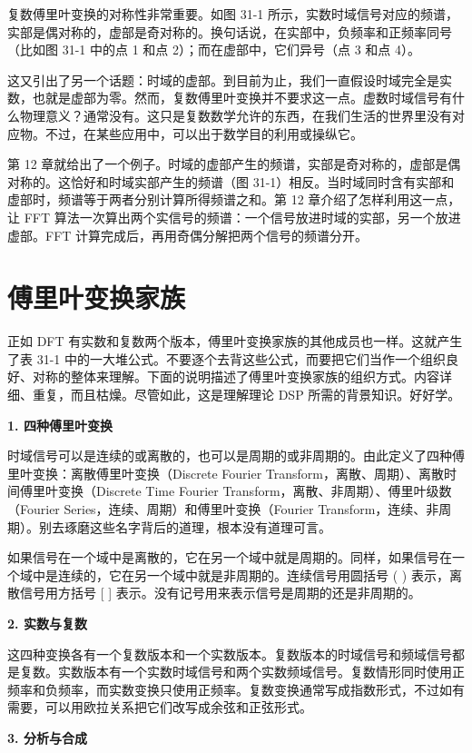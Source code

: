 复数傅里叶变换的对称性非常重要。如图 31-1
所示，实数时域信号对应的频谱，实部是偶对称的，虚部是奇对称的。换句话说，在实部中，负频率和正频率同号（比如图
31-1 中的点 1 和点 2）；而在虚部中，它们异号（点 3 和点 4）。

这又引出了另一个话题：时域的虚部。到目前为止，我们一直假设时域完全是实数，也就是虚部为零。然而，复数傅里叶变换并不要求这一点。虚数时域信号有什么物理意义？通常没有。这只是复数数学允许的东西，在我们生活的世界里没有对应物。不过，在某些应用中，可以出于数学目的利用或操纵它。

第 12
章就给出了一个例子。时域的虚部产生的频谱，实部是奇对称的，虚部是偶对称的。这恰好和时域实部产生的频谱（图
31-1）相反。当时域同时含有实部和虚部时，频谱等于两者分别计算所得频谱之和。第
12 章介绍了怎样利用这一点，让 FFT
算法一次算出两个实信号的频谱：一个信号放进时域的实部，另一个放进虚部。FFT
计算完成后，再用奇偶分解把两个信号的频谱分开。

\section{傅里叶变换家族}

正如 DFT
有实数和复数两个版本，傅里叶变换家族的其他成员也一样。这就产生了表 31-1
中的一大堆公式。不要逐个去背这些公式，而要把它们当作一个组织良好、对称的整体来理解。下面的说明描述了傅里叶变换家族的组织方式。内容详细、重复，而且枯燥。尽管如此，这是理解理论
DSP 所需的背景知识。好好学。

\textbf{1. 四种傅里叶变换}

时域信号可以是连续的或离散的，也可以是周期的或非周期的。由此定义了四种傅里叶变换：离散傅里叶变换（Discrete
Fourier Transform，离散、周期）、离散时间傅里叶变换（Discrete Time
Fourier Transform，离散、非周期）、傅里叶级数（Fourier
Series，连续、周期）和傅里叶变换（Fourier
Transform，连续、非周期）。别去琢磨这些名字背后的道理，根本没有道理可言。

如果信号在一个域中是离散的，它在另一个域中就是周期的。同样，如果信号在一个域中是连续的，它在另一个域中就是非周期的。连续信号用圆括号
( ) 表示，离散信号用方括号 {[} {]}
表示。没有记号用来表示信号是周期的还是非周期的。

\textbf{2. 实数与复数}

这四种变换各有一个复数版本和一个实数版本。复数版本的时域信号和频域信号都是复数。实数版本有一个实数时域信号和两个实数频域信号。复数情形同时使用正频率和负频率，而实数变换只使用正频率。复数变换通常写成指数形式，不过如有需要，可以用欧拉关系把它们改写成余弦和正弦形式。

\textbf{3. 分析与合成}

